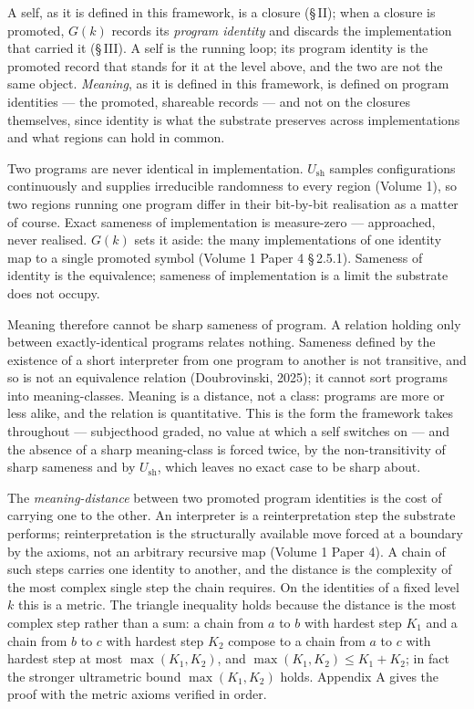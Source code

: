 \documentclass[11pt,oneside]{report}
\theoremstyle{definition}
\theoremstyle{remark}
\begin{document}
A self, as it is defined in this framework, is a closure (\S\,II); when a
closure is promoted, \ensuremath{G(k)} records its \emph{program identity} and
discards the implementation that carried it (\S\,III). A self is the running
loop; its program identity is the promoted record that stands for it at the
level above, and the two are not the same object. \emph{Meaning}, as it is
defined in this framework, is defined on program identities --- the promoted,
shareable records --- and not on the closures themselves, since identity is
what the substrate preserves across implementations and what regions can hold
in common.

Two programs are never identical in implementation.
\ensuremath{U_{\mathrm{sh}}} samples configurations continuously and supplies
irreducible randomness to every region (Volume 1), so two regions running one
program differ in their bit-by-bit realisation as a matter of course. Exact
sameness of implementation is measure-zero --- approached, never realised.
\ensuremath{G(k)} sets it aside: the many implementations of one identity map
to a single promoted symbol (Volume 1 Paper 4 \S\,2.5.1). Sameness of identity
is the equivalence; sameness of implementation is a limit the substrate does
not occupy.

Meaning therefore cannot be sharp sameness of program. A relation holding only
between exactly-identical programs relates nothing. Sameness defined by the
existence of a short interpreter from one program to another is not transitive,
and so is not an equivalence relation (Doubrovinski, 2025); it cannot sort
programs into meaning-classes. Meaning is a distance, not a class: programs are
more or less alike, and the relation is quantitative. This is the form the
framework takes throughout --- subjecthood graded, no value at which a self
switches on --- and the absence of a sharp meaning-class is forced twice, by
the non-transitivity of sharp sameness and by \ensuremath{U_{\mathrm{sh}}},
which leaves no exact case to be sharp about.

The \emph{meaning-distance} between two promoted program identities is the cost
of carrying one to the other. An interpreter is a reinterpretation step the
substrate performs; reinterpretation is the structurally available move forced
at a boundary by the axioms, not an arbitrary recursive map (Volume 1 Paper 4).
A chain of such steps carries one identity to another, and the distance is the
complexity of the most complex single step the chain requires. On the
identities of a fixed level \ensuremath{k} this is a metric. The triangle
inequality holds because the distance is the most complex step rather than a
sum: a chain from \ensuremath{a} to \ensuremath{b} with hardest step
\ensuremath{K_1} and a chain from \ensuremath{b} to \ensuremath{c} with hardest
step \ensuremath{K_2} compose to a chain from \ensuremath{a} to \ensuremath{c}
with hardest step at most \ensuremath{\max(K_1, K_2)}, and
\ensuremath{\max(K_1, K_2) \le K_1 + K_2}; in fact the stronger ultrametric
bound \ensuremath{\max(K_1, K_2)} holds. Appendix A gives the proof with the
metric axioms verified in order.
\end{document}
